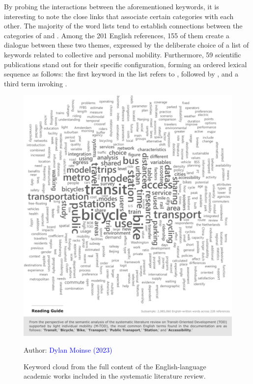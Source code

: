 \begin{refsegment}
By probing the interactions between the aforementioned keywords, it is interesting to note the close links that associate certain categories with each other. The majority of the word lists tend to establish connections between the categories of  and . Among the 201 English references, 155 of them create a dialogue between these two themes, expressed by the deliberate choice of a list of keywords related to collective and personal mobility. Furthermore, 59 scientific publications stand out for their specific configuration, forming an ordered lexical sequence as follows: the first keyword in the list refers to , followed by , and a third term invoking .%

    \begin{figure}[h!]\vspace*{4pt}
        \caption{Keyword cloud from the full content of the English-language academic works included in the systematic literature review.}
        \label{fig-chap2:contenu-textuel-rsl}
        \centerline{\includegraphics[width=1\columnwidth]{src/Figures/Chap-2/EN_RSL_Mots_contenu.pdf}}
        \vspace{5pt}
        \begin{flushright}\scriptsize{
        Author: \textcolor{blue}{Dylan Moinse (2023)}
        }\end{flushright}
    \end{figure}


\end{refsegment}
